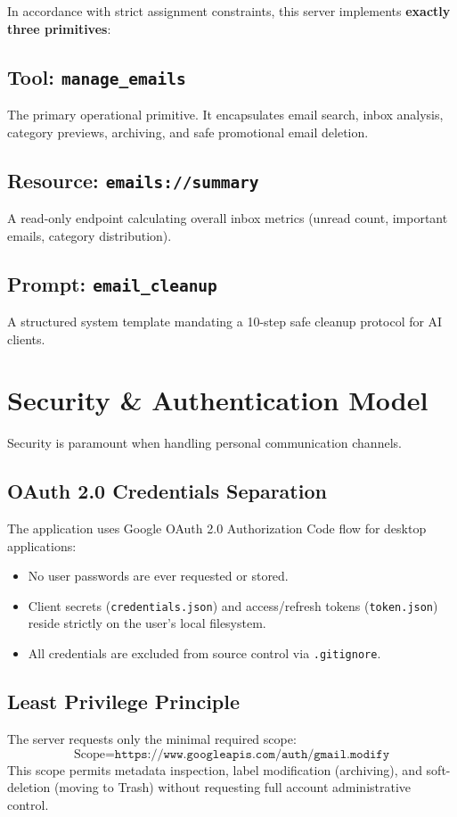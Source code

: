 \documentclass[11pt,a4paper]{article}
\begin{document}
In accordance with strict assignment constraints, this server implements \textbf{exactly three primitives}:

\subsection{Tool: \texttt{manage\_emails}}
The primary operational primitive. It encapsulates email search, inbox analysis, category previews, archiving, and safe promotional email deletion.

\subsection{Resource: \texttt{emails://summary}}
A read-only endpoint calculating overall inbox metrics (unread count, important emails, category distribution).

\subsection{Prompt: \texttt{email\_cleanup}}
A structured system template mandating a 10-step safe cleanup protocol for AI clients.

\section{Security \& Authentication Model}
Security is paramount when handling personal communication channels.

\subsection{OAuth 2.0 Credentials Separation}
The application uses Google OAuth 2.0 Authorization Code flow for desktop applications:
\begin{itemize}
    \item No user passwords are ever requested or stored.
    \item Client secrets (\texttt{credentials.json}) and access/refresh tokens (\texttt{token.json}) reside strictly on the user's local filesystem.
    \item All credentials are excluded from source control via \texttt{.gitignore}.
\end{itemize}

\subsection{Least Privilege Principle}
The server requests only the minimal required scope:
\begin{equation}
\text{Scope} = \texttt{https://www.googleapis.com/auth/gmail.modify}
\end{equation}
This scope permits metadata inspection, label modification (archiving), and soft-deletion (moving to Trash) without requesting full account administrative control.
\end{document}
